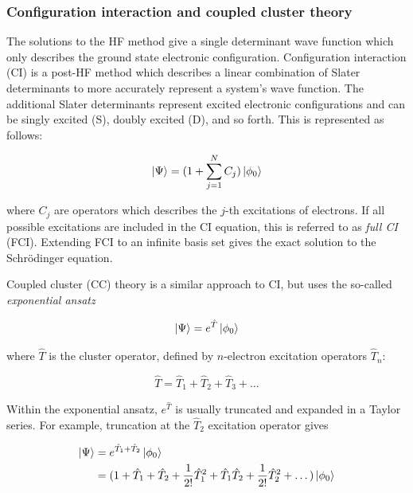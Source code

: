 \subsubsection{Configuration interaction and coupled cluster theory}

The solutions to the HF method give a single determinant wave function which
only describes the ground state electronic configuration. Configuration
interaction (CI) is a post-HF method which describes a linear combination of
Slater determinants to more accurately represent a system's wave function. The
additional Slater determinants represent excited electronic configurations and
can be singly excited (S), doubly excited (D), and so forth. This is
represented as follows:

\begin{equation}
  \ket{\Psi} = (1+\sum_{j=1}^N C_j) \ket{\phi_0}
\end{equation}

\noindent where $C_j$ are operators which describes the $j$-th excitations of
electrons. If all possible excitations are included in the CI equation, this is
referred to as \emph{full CI} (FCI). Extending FCI to an infinite basis set
gives the exact solution to the Schr{\"o}dinger equation.

Coupled cluster (CC) theory\cite{Crawford2000} is a similar approach to CI, but
uses the so-called \emph{exponential ansatz}

\begin{equation}
  \ket{\Psi} = e^{\hat{T}}\ket{\phi_0}
\end{equation}

\noindent where $\hat{T}$ is the cluster operator, defined by $n$-electron
excitation operators $\hat{T}_n$:

\begin{equation}
  \hat{T} = \hat{T}_1 + \hat{T}_2 + \hat{T}_3 + \dots
\end{equation}

Within the exponential ansatz, $e^{\hat{T}}$ is usually truncated and expanded
in a Taylor series. For example, truncation at the $\hat{T}_2$ excitation
operator gives

\begin{equation}
\begin{split}
  \ket{\Psi} &= e^{\hat{T}_1+\hat{T}_2}\ket{\phi_0} \\
  &= (1 + \hat{T}_1 + \hat{T}_2 +  \frac{1}{2!}\hat{T}_1^2 + \hat{T}_1\hat{T}_2 + \frac{1}{2!}\hat{T}_2^2 + \dots)
  \ket{\phi_0}
\end{split}
\end{equation}

